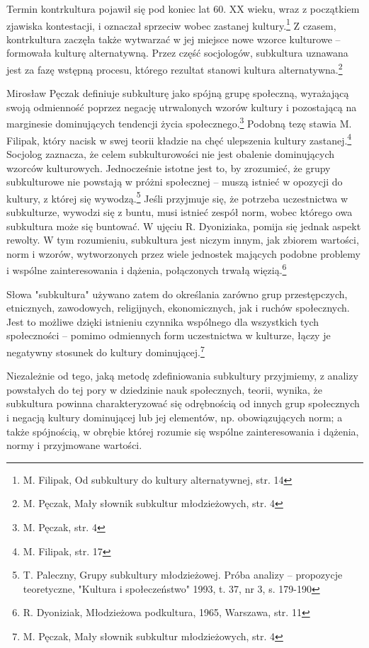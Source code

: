\documentclass[12pt, a4paper, titlepage]{report}
\begin{document}
Termin kontrkultura pojawił się pod koniec lat 60. XX wieku, wraz z początkiem zjawiska kontestacji, i oznaczał sprzeciw wobec zastanej kultury.\footnote{M. Filipak, Od subkultury do kultury alternatywnej, str. 14} Z czasem, kontrkultura zaczęła także wytwarzać w jej miejsce nowe wzorce kulturowe -- formowała kulturę alternatywną. Przez część socjologów, subkultura uznawana jest za fazę wstępną procesu, którego rezultat stanowi kultura alternatywna.\footnote{M. Pęczak, Mały słownik subkultur młodzieżowych, str. 4}


Mirosław Pęczak definiuje subkulturę jako spójną grupę społeczną, wyrażającą swoją odmienność poprzez negację utrwalonych wzorów kultury i pozostającą na marginesie dominujących tendencji życia społecznego.\footnote{M. Pęczak, str. 4} Podobną tezę stawia M. Filipak, który nacisk w swej teorii kładzie na chęć ulepszenia kultury zastanej.\footnote{M. Filipak, str. 17} Socjolog zaznacza, że celem subkulturowości nie jest obalenie dominujących wzorców kulturowych. Jednocześnie istotne jest to, by zrozumieć, że grupy subkulturowe nie powstają w próżni społecznej -- muszą istnieć w opozycji do kultury, z której się wywodzą.\footnote{T. Paleczny, Grupy subkultury młodzieżowej. Próba analizy -- propozycje teoretyczne, "Kultura i społeczeństwo" 1993, t. 37, nr 3, s. 179-190} Jeśli przyjmuje się, że potrzeba uczestnictwa w subkulturze, wywodzi się z buntu, musi istnieć zespół norm, wobec którego owa subkultura może się buntować. W ujęciu R. Dyoniziaka, pomija się jednak aspekt rewolty. W tym rozumieniu, subkultura jest niczym innym, jak zbiorem wartości, norm i wzorów, wytworzonych przez wiele jednostek mających podobne problemy i wspólne zainteresowania i dążenia, połączonych trwałą więzią.\footnote{R. Dyoniziak, Młodzieżowa podkultura, 1965, Warszawa, str. 11} 

Słowa "subkultura" używano zatem do określania zarówno grup przestępczych, etnicznych, zawodowych, religijnych, ekonomicznych, jak i ruchów społecznych. Jest to możliwe dzięki istnieniu czynnika wspólnego dla wszystkich tych społeczności -- pomimo odmiennych form uczestnictwa w kulturze, łączy je negatywny stosunek do kultury dominującej.\footnote{M. Pęczak, Mały słownik subkultur młodzieżowych, str. 4}

Niezależnie od tego, jaką metodę zdefiniowania subkultury przyjmiemy, z analizy powstałych do tej pory w dziedzinie nauk społecznych, teorii, wynika, że subkultura powinna charakteryzować się odrębnością od innych grup społecznych i negacją kultury dominującej lub jej elementów, np. obowiązujących norm; a także spójnością, w obrębie której rozumie się wspólne zainteresowania i dążenia, normy i przyjmowane wartości. 
\end{document}
